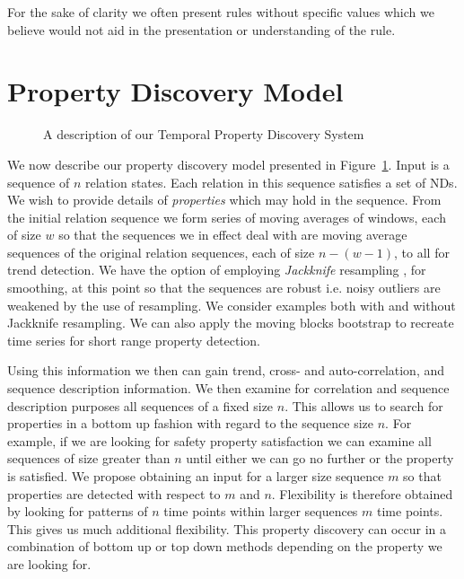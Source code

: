 For the sake of clarity we often present rules without specific values
which we believe would not aid in the presentation or understanding of
the rule.

\section{Property Discovery Model}\label{sec:tr_propmodel}



\begin{figure}[ht]
\centerline{}
\caption{\label{fig:model2} A description of our Temporal Property
Discovery System}
\end{figure}


We now describe our property discovery model presented in
Figure~\ref{fig:model2}. Input is a sequence of $n$ relation states.
Each relation in this sequence
satisfies a set of NDs. We wish to provide details of {\em properties}
which may hold in the sequence. From the initial relation sequence we
form series of moving averages of windows, each of size $w$ so that
the sequences we in effect deal with are
moving average sequences of the original relation sequences, each of
size $n - (w-1)$, to all for trend detection. 
We have the option of employing {\em Jackknife}
resampling \cite{efr82}, for smoothing, at this point so that the sequences are robust i.e. noisy
outliers are weakened by the use of resampling.  We consider examples both with
and without Jackknife resampling. We can also apply the moving blocks
bootstrap to recreate time series for short range property detection.
\medskip


Using
this information we then can gain trend, cross- and auto-correlation,
and sequence description information. We then examine for correlation
and sequence description purposes all sequences of a fixed size
$n$. This allows us to search for properties in a bottom up fashion with
regard to the sequence size $n$. For example, if we are looking for
safety property satisfaction we can examine all sequences of size
greater than $n$ until either we can go no further or the property is
satisfied. We propose obtaining an input for a larger size sequence
$m$ so
that properties are detected with respect to $m$ and $n$. Flexibility
is therefore obtained by looking for patterns of $n$ time points
within larger sequences $m$ time points. This gives us much additional
flexibility. This property discovery can occur in a combination of
bottom up or top down methods depending on the property we are looking
for.

